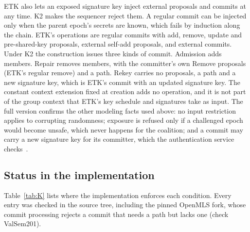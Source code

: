 \documentclass[aps,prx,reprint,superscriptaddress,nofootinbib,floatfix]{revtex4-2}
\theoremstyle{remark}
\begin{document}
ETK also lets an exposed signature key inject external proposals and commits at any time. K2 makes the sequencer reject them. A regular commit can be injected only when the parent epoch's secrets are known, which fails by induction along the chain. ETK's operations are regular commits with add, remove, update and pre-shared-key proposals, external self-add proposals, and external commits. Under K2 the construction issues three kinds of commit. Admission adds members. Repair removes members, with the committer's own Remove proposals (ETK's regular remove) and a path. Rekey carries no proposals, a path and a new signature key, which is ETK's commit with an updated signature key. The constant context extension fixed at creation adds no operation, and it is not part of the group context that ETK's key schedule and signatures take as input. The full version confirms the other modeling facts used above: no input restriction applies to corrupting randomness; exposure is refused only if a challenged epoch would become unsafe, which never happens for the coalition; and a commit may carry a new signature key for its committer, which the authentication service checks~\cite{note-etk}.

\subsection{Status in the implementation}

Table~\ref{tab:K} lists where the implementation enforces each condition. Every entry was checked in the source tree, including the pinned OpenMLS fork, whose commit processing rejects a commit that needs a path but lacks one (check ValSem201).
\end{document}
